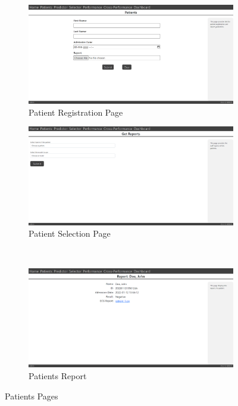 \begin{figure}
  \centering
  \begin{subfigure}{.7\columnwidth}
    \includegraphics[width=\columnwidth]{media/website/pages/registration.png}
    \caption{Patient Registration Page}\label{fig:patient_registration_page}
  \end{subfigure}
  \begin{subfigure}{.7\columnwidth}
    \includegraphics[width=\columnwidth]{media/website/pages/get_report.png}
    \caption{Patient Selection Page}\label{fig:patient_selection_page}
  \end{subfigure} \\
  \begin{subfigure}{.7\columnwidth}
    \includegraphics[width=\columnwidth]{media/website/pages/get_report_display.png}
    \caption{Patients Report}\label{fig:patients_report}
  \end{subfigure}
  \caption{Patients Pages}\label{fig:patients_page}
\end{figure}


